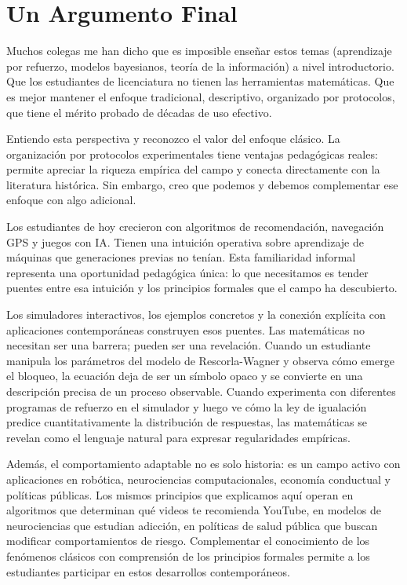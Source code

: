 \documentclass[
  letterpaper,
  DIV=11,
  numbers=noendperiod]{scrreprt}
\begin{document}
\section{Un Argumento Final}\label{un-argumento-final}

Muchos colegas me han dicho que es imposible enseñar estos temas
(aprendizaje por refuerzo, modelos bayesianos, teoría de la información)
a nivel introductorio. Que los estudiantes de licenciatura no tienen las
herramientas matemáticas. Que es mejor mantener el enfoque tradicional,
descriptivo, organizado por protocolos, que tiene el mérito probado de
décadas de uso efectivo.

Entiendo esta perspectiva y reconozco el valor del enfoque clásico. La
organización por protocolos experimentales tiene ventajas pedagógicas
reales: permite apreciar la riqueza empírica del campo y conecta
directamente con la literatura histórica. Sin embargo, creo que podemos
y debemos complementar ese enfoque con algo adicional.

Los estudiantes de hoy crecieron con algoritmos de recomendación,
navegación GPS y juegos con IA. Tienen una intuición operativa sobre
aprendizaje de máquinas que generaciones previas no tenían. Esta
familiaridad informal representa una oportunidad pedagógica única: lo
que necesitamos es tender puentes entre esa intuición y los principios
formales que el campo ha descubierto.

Los simuladores interactivos, los ejemplos concretos y la conexión
explícita con aplicaciones contemporáneas construyen esos puentes. Las
matemáticas no necesitan ser una barrera; pueden ser una revelación.
Cuando un estudiante manipula los parámetros del modelo de
Rescorla-Wagner y observa cómo emerge el bloqueo, la ecuación deja de
ser un símbolo opaco y se convierte en una descripción precisa de un
proceso observable. Cuando experimenta con diferentes programas de
refuerzo en el simulador y luego ve cómo la ley de igualación predice
cuantitativamente la distribución de respuestas, las matemáticas se
revelan como el lenguaje natural para expresar regularidades empíricas.

Además, el comportamiento adaptable no es solo historia: es un campo
activo con aplicaciones en robótica, neurociencias computacionales,
economía conductual y políticas públicas. Los mismos principios que
explicamos aquí operan en algoritmos que determinan qué videos te
recomienda YouTube, en modelos de neurociencias que estudian adicción,
en políticas de salud pública que buscan modificar comportamientos de
riesgo. Complementar el conocimiento de los fenómenos clásicos con
comprensión de los principios formales permite a los estudiantes
participar en estos desarrollos contemporáneos.
\end{document}
